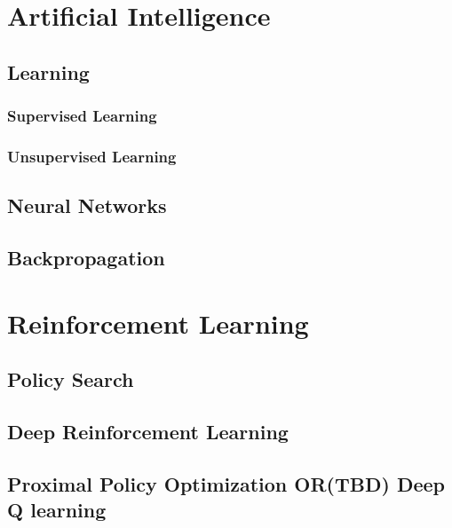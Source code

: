 
\chapter{Artificial Intelligence}
\section{Learning}
\subsection{Supervised Learning}
\subsection{Unsupervised Learning}
\section{Neural Networks}
\section{Backpropagation}

\chapter{Reinforcement Learning}
\section{Policy Search}
\section{Deep Reinforcement Learning}
\section{Proximal Policy Optimization OR(TBD) Deep Q learning}

